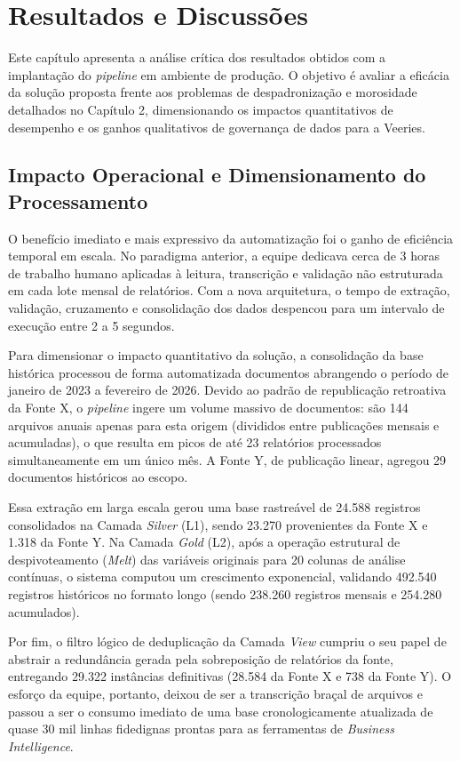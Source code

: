 \chapter{Resultados e Discussões}

Este capítulo apresenta a análise crítica dos resultados obtidos com a implantação do \textit{pipeline} em ambiente de produção. O objetivo é avaliar a eficácia da solução proposta frente aos problemas de despadronização e morosidade detalhados no Capítulo 2, dimensionando os impactos quantitativos de desempenho e os ganhos qualitativos de governança de dados para a Veeries.

\section{Impacto Operacional e Dimensionamento do Processamento}

O benefício imediato e mais expressivo da automatização foi o ganho de eficiência temporal em escala. No paradigma anterior, a equipe dedicava cerca de 3 horas de trabalho humano aplicadas à leitura, transcrição e validação não estruturada em cada lote mensal de relatórios. Com a nova arquitetura, o tempo de extração, validação, cruzamento e consolidação dos dados despencou para um intervalo de execução entre 2 a 5 segundos.

Para dimensionar o impacto quantitativo da solução, a consolidação da base histórica processou de forma automatizada documentos abrangendo o período de janeiro de 2023 a fevereiro de 2026. Devido ao padrão de republicação retroativa da Fonte X, o \textit{pipeline} ingere um volume massivo de documentos: são 144 arquivos anuais apenas para esta origem (divididos entre publicações mensais e acumuladas), o que resulta em picos de até 23 relatórios processados simultaneamente em um único mês. A Fonte Y, de publicação linear, agregou 29 documentos históricos ao escopo.

Essa extração em larga escala gerou uma base rastreável de 24.588 registros consolidados na Camada \textit{Silver} (L1), sendo 23.270 provenientes da Fonte X e 1.318 da Fonte Y. Na Camada \textit{Gold} (L2), após a operação estrutural de despivoteamento (\textit{Melt}) das variáveis originais para 20 colunas de análise contínuas, o sistema computou um crescimento exponencial, validando 492.540 registros históricos no formato longo (sendo 238.260 registros mensais e 254.280 acumulados). 

Por fim, o filtro lógico de deduplicação da Camada \textit{View} cumpriu o seu papel de abstrair a redundância gerada pela sobreposição de relatórios da fonte, entregando 29.322 instâncias definitivas (28.584 da Fonte X e 738 da Fonte Y). O esforço da equipe, portanto, deixou de ser a transcrição braçal de arquivos e passou a ser o consumo imediato de uma base cronologicamente atualizada de quase 30 mil linhas fidedignas prontas para as ferramentas de \textit{Business Intelligence}.

